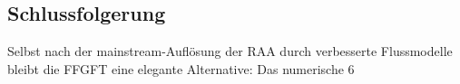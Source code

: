 	\subsection*{Schlussfolgerung}
	
	Selbst nach der mainstream-Auflösung der RAA durch verbesserte Flussmodelle bleibt die FFGFT eine elegante Alternative: Das numerische 6 %




